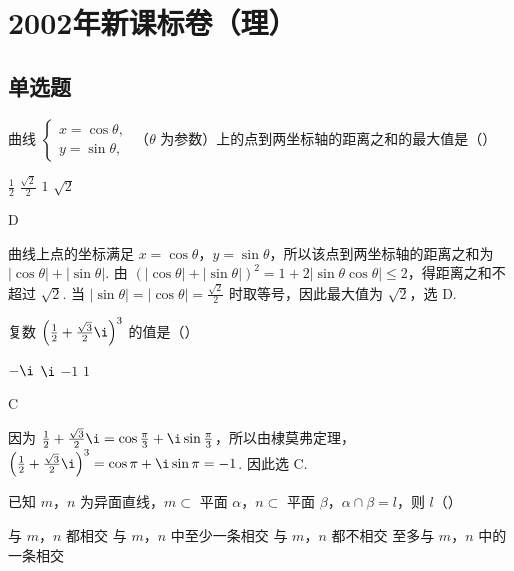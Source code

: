 \chapter{2002年新课标卷（理）}
\section{单选题}
\begin{problem}
曲线 \(\begin{cases}
x = \cos \theta,\\
y = \sin \theta,
\end{cases}\) （\(\theta\) 为参数）上的点到两坐标轴的距离之和的最大值是（\quad）

\choices
    {\(\frac{1}{2}\)}
    {\(\frac{\sqrt{2}}{2}\)}
    {\(1\)}
    {\(\sqrt{2}\)}
\end{problem}

\begin{answer}
D
\end{answer}

\begin{solution}
曲线上点的坐标满足 \(x=\cos\theta\)，\(y=\sin\theta\)，所以该点到两坐标轴的距离之和为 \(|\cos\theta|+|\sin\theta|\). 由
\((|\cos\theta|+|\sin\theta|)^2=1+2|\sin\theta\cos\theta|\leqslant2\)，得距离之和不超过 \(\sqrt{2}\). 当 \(|\sin\theta|=|\cos\theta|=\frac{\sqrt{2}}{2}\) 时取等号，因此最大值为 \(\sqrt{2}\)，选 D.
\end{solution}

\begin{problem}
复数 \(\left(\frac{1}{2} + \frac{\sqrt{3}}{2}\i\right)^3\) 的值是（\quad）

\choices
    {\(-\i\)}
    {\(\i\)}
    {\(-1\)}
    {\(1\)}
\end{problem}

\begin{answer}
C
\end{answer}

\begin{solution}
因为 \(\frac{1}{2}+\frac{\sqrt{3}}{2}\i=\cos\frac{\pi}{3}+\i\sin\frac{\pi}{3}\)，所以由棣莫弗定理，
\(\left(\frac{1}{2}+\frac{\sqrt{3}}{2}\i\right)^3=\cos\pi+\i\sin\pi=-1\). 因此选 C.
\end{solution}

\begin{problem}
已知 \(m\)，\(n\) 为异面直线，\(m \subset\) 平面 \(\alpha\)，\(n \subset\) 平面 \(\beta\)，\(\alpha \cap \beta = l\)，则 \(l\)（\quad）

\choices
    {与 \(m\)，\(n\) 都相交}
    {与 \(m\)，\(n\) 中至少一条相交}
    {与 \(m\)，\(n\) 都不相交}
    {至多与 \(m\)，\(n\) 中的一条相交}
\end{problem}

